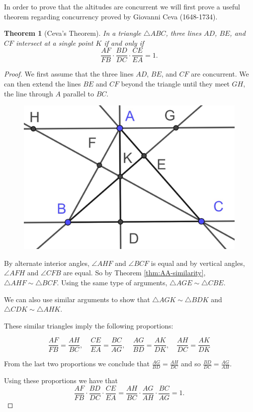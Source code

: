 \documentclass[
]{book}
\newtheorem{theorem}{Theorem}[chapter]
\theoremstyle{definition}
\theoremstyle{definition}
\theoremstyle{definition}
\theoremstyle{definition}
\theoremstyle{remark}
\begin{document}
In order to prove that the altitudes are concurrent we will first prove a useful theorem regarding concurrency proved by Giovanni Ceva (1648-1734).

\begin{theorem}[Ceva's Theorem]
In a triangle \(\triangle ABC\), three lines \(AD\), \(BE\), and \(CF\) intersect at a single point \(K\) if and only if
\[\frac{AF}{FB} \cdot \frac{BD}{DC} \cdot \frac{CE}{EA} = 1.\]
\end{theorem}

\begin{proof}
We first assume that the three lines \(AD\), \(BE\), and \(CF\) are concurrent. We can then extend the lines \(BE\) and \(CF\) beyond the triangle until they meet \(GH\), the line through \(A\) parallel to \(BC\).

\begin{figure}

{\centering \includegraphics[width=0.3\linewidth]{images/Ceva1} 

}

\end{figure}

By alternate interior angles, \(\angle AHF\) and \(\angle BCF\) is equal and by vertical angles, \(\angle AFH\) and \(\angle CFB\) are equal. So by Theorem \ref{thm:AA-similarity}, \(\triangle AHF \sim \triangle BCF\). Using the same type of arguments, \(\triangle AGE \sim \triangle CBE\).

We can also use similar arguments to show that \(\triangle AGK \sim \triangle BDK\) and \(\triangle CDK \sim \triangle AHK\).

These similar triangles imply the following proportions:

\[ \frac{AF}{FB} = \frac{AH}{BC}, \quad \frac{CE}{EA} = \frac{BC}{AG}, \quad \frac{AG}{BD} = \frac{AK}{DK}, \quad \frac{AH}{DC}=\frac{AK}{DK}\]

From the last two proportions we conclude that \(\frac{AG}{BD} = \frac{AH}{DC}\) and so \(\frac{BD}{DC} = \frac{AG}{AH}\).

Using these proportions we have that \[\frac{AF}{FB} \cdot \frac{BD}{DC} \cdot \frac{CE}{EA} = \frac{AH}{BC} \cdot \frac{AG}{AH} \cdot \frac{BC}{AG} = 1.\]


\end{proof}
\end{document}
